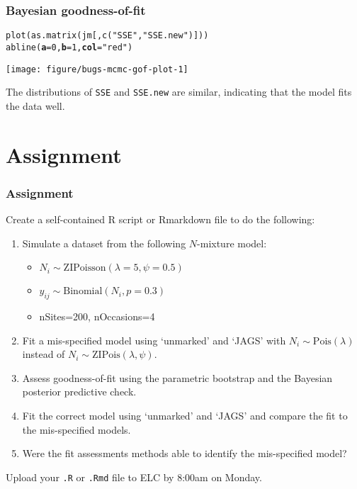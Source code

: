 \documentclass[color=usenames,dvipsnames]{beamer}\usepackage[]{graphicx}\usepackage[]{xcolor}
\makeatletter
\newcommand{\hlnum}[1]{\textcolor[rgb]{0.69,0.494,0}{#1}}%
\newcommand{\hlsng}[1]{\textcolor[rgb]{0.749,0.012,0.012}{#1}}%
\newcommand{\hldef}[1]{\textcolor[rgb]{0,0,0}{#1}}%
\newcommand{\hlkwc}[1]{\textcolor[rgb]{0,0,0}{\textbf{#1}}}%
\newcommand{\hlkwd}[1]{\textcolor[rgb]{0.004,0.004,0.506}{#1}}%
\newenvironment{kframe}{%
 \def\at@end@of@kframe{}%
 \ifinner\ifhmode%
  \def\at@end@of@kframe{\end{minipage}}%
  \begin{minipage}{\columnwidth}%
 \fi\fi%
 \def\FrameCommand##1{\hskip\@totalleftmargin \hskip-\fboxsep
 \colorbox{shadecolor}{##1}\hskip-\fboxsep
     \hskip-\linewidth \hskip-\@totalleftmargin \hskip\columnwidth}%
 \MakeFramed {\advance\hsize-\width
   \@totalleftmargin\z@ \linewidth\hsize
   \@setminipage}}%
 {\par\unskip\endMakeFramed%
 \at@end@of@kframe}
\newenvironment{knitrout}{}{} %
\newcommand{\inr}[1]{\colorbox{inlinecolor}{\texttt{#1}}}
\makeatother
\begin{document}
\begin{frame}[fragile]
  \frametitle{Bayesian goodness-of-fit}
\begin{knitrout}\footnotesize
{}\color{fgcolor}\begin{kframe}
\begin{alltt}
\hlkwd{plot}\hldef{(}\hlkwd{as.matrix}\hldef{(jm[,}\hlkwd{c}\hldef{(}\hlsng{"SSE"}\hldef{,} \hlsng{"SSE.new"}\hldef{)]))}
\hlkwd{abline}\hldef{(}\hlkwc{a}\hldef{=}\hlnum{0}\hldef{,} \hlkwc{b}\hldef{=}\hlnum{1}\hldef{,} \hlkwc{col}\hldef{=}\hlsng{"red"}\hldef{)}
\end{alltt}
\end{kframe}

{\centering \texttt{[image: figure/bugs-mcmc-gof-plot-1]} 

}


\end{knitrout}
  \vfill
  \small
  The distributions of {\tt SSE} and {\tt SSE.new} are similar,
  indicating that the model fits the data well.
\end{frame}






\section{Assignment}




\begin{frame}[fragile]
  \frametitle{Assignment}
  \footnotesize
  Create a self-contained R script or Rmarkdown file
  to do the following:
  \vfill
  \begin{enumerate}
    \footnotesize
    \item Simulate a dataset from the following $N$-mixture model:
      \begin{itemize}
        \footnotesize
        \item $N_i \sim \mathrm{ZIPoisson}(\lambda=5, \psi=0.5)$
        \item $y_{ij} \sim \mathrm{Binomial}(N_i, p=0.3)$
        \item nSites=200, nOccasions=4
      \end{itemize}
    \item Fit a \alert{mis-specified model} using `unmarked' and `JAGS' with
      $N_i \sim \mathrm{Pois}(\lambda)$ instead of
      $N_i \sim \mathrm{ZIPois}(\lambda, \psi)$.
    \item Assess goodness-of-fit using the parametric bootstrap and
      the Bayesian posterior predictive check.
    \item Fit the \alert{correct model} using `unmarked' and `JAGS'
      and compare the fit to the mis-specified models.
    \item Were the fit assessments methods able to identify the
      mis-specified model?
  \end{enumerate}
  \vfill
  Upload your {\tt .R} or {\tt .Rmd} file to ELC by 8:00am on Monday. 
\end{frame}
\end{document}
